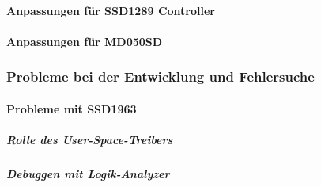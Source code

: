 \paragraph{Anpassungen für SSD1289 Controller}
\paragraph{Anpassungen für MD050SD}
\subsubsection{Probleme bei der Entwicklung und Fehlersuche}
\paragraph{Probleme mit SSD1963}
\subparagraph{Rolle des User-Space-Treibers}
\subparagraph{Debuggen mit Logik-Analyzer}




